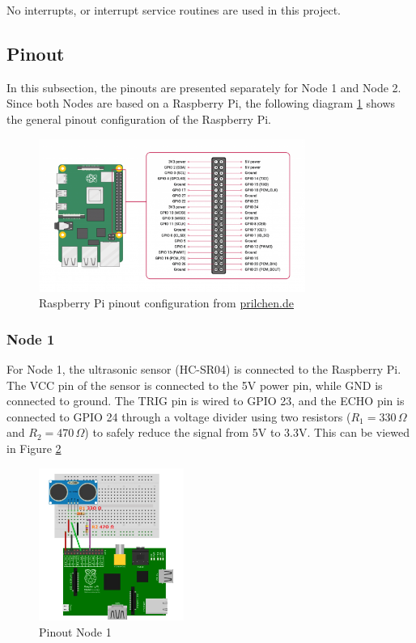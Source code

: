 No interrupts, or interrupt service routines are used in this project.

\subsection{Pinout}

In this subsection, the pinouts are presented separately for Node 1 and Node 2. Since both Nodes are based on a Raspberry Pi, the following diagram \ref{fig:raspi} shows the general pinout configuration of the Raspberry Pi.

\begin{figure}[h]
	\includegraphics[height=50mm]{images/GPIO-Pinout-Diagram-2.png}
	\centering
	\caption{Raspberry Pi pinout configuration from \href{https://prilchen.de/raspberry-pis-gpio-ein-tor-zu-unzaehligen-projekten/} {prilchen.de}}
	\label{fig:raspi}
\end{figure}

\subsubsection{Node 1}

For Node 1, the ultrasonic sensor (HC-SR04) is connected to the Raspberry Pi. The VCC pin of the sensor is connected to the 5V power pin, while GND is connected to ground. The TRIG pin is wired to GPIO 23, and the ECHO pin is connected to GPIO 24 through a voltage divider using two resistors ($R_1 = 330\,\Omega$ and $R_2 = 470\,\Omega$) to safely reduce the signal from 5V to 3.3V. This can be viewed in Figure \ref{fig:node1-pinout}


\begin{figure}[h]
	\includegraphics[height=50mm]{images/pinout_node1.png}
	\centering
	\caption{Pinout Node 1}
	\label{fig:node1-pinout}
\end{figure}

